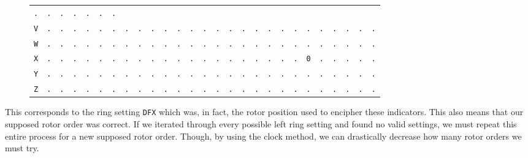 \begin{figure}[H]
\begin{center}
{\begin{tabular}{c|cccccccccccccccccccccccccc}
        \texttt{.} & \texttt{.} & \texttt{.} & \texttt{.} &
        \texttt{.} & \texttt{.} & \texttt{.}                             \\
        \texttt{V} & \texttt{.} & \texttt{.} & \texttt{.} &
        \texttt{.} & \texttt{.} & \texttt{.} & \texttt{.} &
        \texttt{.} & \texttt{.} & \texttt{.} & \texttt{.} &
        \texttt{.} & \texttt{.} & \texttt{.} & \texttt{.} &
        \texttt{.} & \texttt{.} & \texttt{.} & \texttt{.} &
        \texttt{.} & \texttt{.} & \texttt{.} & \texttt{.} &
        \texttt{.} & \texttt{.} & \texttt{.}                             \\
        \texttt{W} & \texttt{.} & \texttt{.} & \texttt{.} &
        \texttt{.} & \texttt{.} & \texttt{.} & \texttt{.} &
        \texttt{.} & \texttt{.} & \texttt{.} & \texttt{.} &
        \texttt{.} & \texttt{.} & \texttt{.} & \texttt{.} &
        \texttt{.} & \texttt{.} & \texttt{.} & \texttt{.} &
        \texttt{.} & \texttt{.} & \texttt{.} & \texttt{.} &
        \texttt{.} & \texttt{.} & \texttt{.}                             \\
        \texttt{X} & \texttt{.} & \texttt{.} & \texttt{.} &
        \texttt{.} & \texttt{.} & \texttt{.} & \texttt{.} &
        \texttt{.} & \texttt{.} & \texttt{.} & \texttt{.} &
        \texttt{.} & \texttt{.} & \texttt{.} & \texttt{.} &
        \texttt{.} & \texttt{.} & \texttt{.} & \texttt{.} &
        \texttt{.} & \texttt{0} & \texttt{.} & \texttt{.} &
        \texttt{.} & \texttt{.} & \texttt{.}                             \\
        \texttt{Y} & \texttt{.} & \texttt{.} & \texttt{.} &
        \texttt{.} & \texttt{.} & \texttt{.} & \texttt{.} &
        \texttt{.} & \texttt{.} & \texttt{.} & \texttt{.} &
        \texttt{.} & \texttt{.} & \texttt{.} & \texttt{.} &
        \texttt{.} & \texttt{.} & \texttt{.} & \texttt{.} &
        \texttt{.} & \texttt{.} & \texttt{.} & \texttt{.} &
        \texttt{.} & \texttt{.} & \texttt{.}                             \\
        \texttt{Z} & \texttt{.} & \texttt{.} & \texttt{.} &
        \texttt{.} & \texttt{.} & \texttt{.} & \texttt{.} &
        \texttt{.} & \texttt{.} & \texttt{.} & \texttt{.} &
        \texttt{.} & \texttt{.} & \texttt{.} & \texttt{.} &
        \texttt{.} & \texttt{.} & \texttt{.} & \texttt{.} &
        \texttt{.} & \texttt{.} & \texttt{.} & \texttt{.} &
        \texttt{.} & \texttt{.} & \texttt{.}                             \\
      \end{tabular}
    }
  \end{center}
\end{figure}
\noindent This corresponds to the ring setting \texttt{DFX} which
was, in fact, the rotor position used to encipher these indicators.
This also means that our supposed rotor order was correct. If we
iterated through every possible left ring setting and found no valid
settings, we must repeat this entire process for a new supposed rotor
order. Though, by using the clock method, we can drastically decrease
how many rotor orders we must try.

